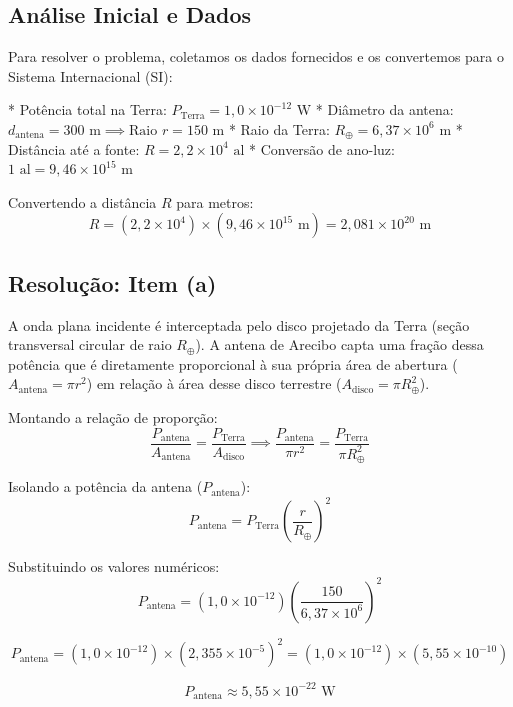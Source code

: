 \documentclass[12pt,a4paper]{article}
\begin{document}

\subsection*{Análise Inicial e Dados}

Para resolver o problema, coletamos os dados fornecidos e os convertemos para o Sistema Internacional (SI):

* Potência total na Terra: $P_{\text{Terra}} = 1,0 \times 10^{-12} \text{ W}$
* Diâmetro da antena: $d_{\text{antena}} = 300 \text{ m} \implies \text{Raio } r = 150 \text{ m}$
* Raio da Terra: $R_{\oplus} = 6,37 \times 10^6 \text{ m}$
* Distância até a fonte: $R = 2,2 \times 10^4 \text{ al}$
* Conversão de ano-luz: $1 \text{ al} = 9,46 \times 10^{15} \text{ m}$

Convertendo a distância $R$ para metros:
\[
R = (2,2 \times 10^4) \times (9,46 \times 10^{15} \text{ m}) = 2,081 \times 10^{20} \text{ m}
\]


\subsection*{Resolução: Item (a)}

A onda plana incidente é interceptada pelo disco projetado da Terra (seção transversal circular de raio $R_{\oplus}$). A antena de Arecibo capta uma fração dessa potência que é diretamente proporcional à sua própria área de abertura ($A_{\text{antena}} = \pi r^2$) em relação à área desse disco terrestre ($A_{\text{disco}} = \pi R_{\oplus}^2$).

Montando a relação de proporção:
\[
\frac{P_{\text{antena}}}{A_{\text{antena}}} = \frac{P_{\text{Terra}}}{A_{\text{disco}}} \implies \frac{P_{\text{antena}}}{\pi r^2} = \frac{P_{\text{Terra}}}{\pi R_{\oplus}^2}
\]

Isolando a potência da antena ($P_{\text{antena}}$):
\[
P_{\text{antena}} = P_{\text{Terra}} \left( \frac{r}{R_{\oplus}} \right)^2
\]

Substituindo os valores numéricos:
\[
P_{\text{antena}} = (1,0 \times 10^{-12}) \left( \frac{150}{6,37 \times 10^6} \right)^2
\]

\[
P_{\text{antena}} = (1,0 \times 10^{-12}) \times (2,355 \times 10^{-5})^2 = (1,0 \times 10^{-12}) \times (5,55 \times 10^{-10})
\]

\[
P_{\text{antena}} \approx 5,55 \times 10^{-22} \text{ W}
\]
\end{document}
